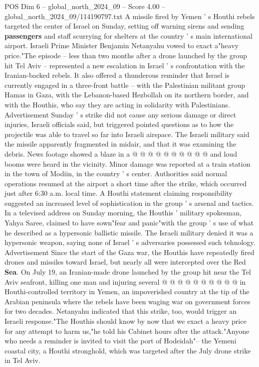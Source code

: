 \begin{textsample}{POS Dim 6 – global\_north\_2024\_09 – Score 4.00 – global\_north\_2024\_09/114190797.txt}  \label{ex:f6_pos_366}
A missile fired by Yemen ' s Houthi rebels targeted the center of Israel on Sunday, setting off warning sirens and sending \textbf{passengers} and staff scurrying for shelters at the country ' s main international airport.
Israeli Prime Minister Benjamin Netanyahu vowed to exact a"heavy price."The episode -- less than two months after a drone launched by the group hit Tel Aviv -- represented a new escalation in Israel ' s confrontation with the Iranian-backed rebels.
It also offered a thunderous reminder that Israel is currently engaged in a three-front battle -- with the Palestinian militant group Hamas in Gaza, with the Lebanon-based Hezbollah on its northern border, and with the Houthis, who say they are acting in solidarity with Palestinians.
Advertisement Sunday ' s strike did not cause any serious damage or direct injuries, Israeli officials said, but triggered pointed questions as to how the projectile was able to travel so far into Israeli airspace.
The Israeli military said the missile apparently fragmented in midair, and that it was examining the debris.
News footage showed a blaze in a @ @ @ @ @ @ @ @ @ @ and loud booms were heard in the vicinity.
Minor damage was reported at a train station in the town of Modiin, in the country ' s center.
Authorities said normal operations resumed at the airport a short time after the strike, which occurred just after 6:30 a.m. local time.
A Houthi statement claiming responsibility suggested an increased level of sophistication in the group ' s arsenal and tactics.
In a televised address on Sunday morning, the Houthis ' military spokesman, Yahya Saree, claimed to have sown"fear and panic"with the group ' s use of what he described as a hypersonic ballistic missile.
The Israeli military denied it was a hypersonic weapon, saying none of Israel ' s adversaries possessed such tehnology.
Advertisement Since the start of the Gaza war, the Houthis have repeatedly fired drones and missiles toward Israel, but nearly all were intercepted over the Red \textbf{Sea}.
On July 19, an Iranian-made drone launched by the group hit near the Tel Aviv seafront, killing one man and injuring several @ @ @ @ @ @ @ @ @ @ in Houthi-controlled territory in Yemen, an impoverished country at the tip of the Arabian peninsula where the rebels have been waging war on government forces for two decades.
Netanyahu indicated that this strike, too, would trigger an Israeli response."The Houthis should know by now that we exact a heavy price for any attempt to harm us,"he told his Cabinet hours after the attack."Anyone who needs a reminder is invited to visit the port of Hodeidah"-- the Yemeni coastal city, a Houthi stronghold, which was targeted after the July drone strike in Tel Aviv.

\end{textsample}
